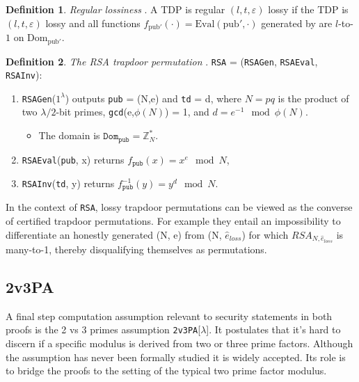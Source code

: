 \documentclass[]{final_report}
\theoremstyle{definition}
\newtheorem{definition}{Definition}[chapter]
\begin{document}
\begin{definition}
\label{def:reg-los}
\textit{Regular lossiness} \cite{10.1145/1374376.1374406, kakvi2018optimal}. A TDP is regular \( (l, t, \varepsilon) \) lossy if the TDP is \( (l, t, \varepsilon) \) lossy and all functions \( f_{\text{pub}'}(\cdot) = \text{Eval}(\text{pub}', \cdot) \) generated by  are \( l \)-to-\( 1 \) on \( \text{Dom}_{\text{pub}'} \).
\end{definition}

\begin{definition} 
\textit{The RSA trapdoor permutation} \cite{kakvi2018optimal}. \texttt{RSA} = (\texttt{RSAGen}, \texttt{RSAEval}, \texttt{RSAInv}): 
\begin{enumerate}
\item \texttt{RSAGen}($1^\lambda$) outputs \texttt{pub} = (N,e) and \texttt{td} = d, where $N = pq$ is the product of two $\lambda/2$-bit primes, \texttt{gcd}(e,$\phi(N)$) = 1, and $d = e^{-1} \mod \phi(N)$. 
\begin{itemize}
\item The domain is $\texttt{Dom}_{\texttt{pub}} = \mathbb{Z}_N^*$. 
\end{itemize}
\item \texttt{RSAEval}(\texttt{pub}, x) returns $f_{\texttt{pub}}(x) = x^e \mod N$, 
\item \texttt{RSAInv}(\texttt{td}, y) returns $f_{\texttt{pub}}^{-1}(y) = y^d \mod N$. 
\end{enumerate}

\end{definition} 

In the context of \texttt{RSA}, lossy trapdoor permutations can be viewed as the converse of certified trapdoor permutations. For example they entail an impossibility to differentiate an honestly generated (N, e) from (N, $\hat{e}_{loss}$) for which $RSA_{N, \hat{e}_{loss}}$ is many-to-1, thereby disqualifying themselves as permutations.


\subsection{2v3PA}
A final step computation assumption relevant to security statements in both proofs is the 2 vs 3 primes assumption \texttt{2v3PA}[$\lambda$]. It postulates that it's hard to discern if a specific modulus is derived from two or three prime factors. Although the assumption has never been formally studied it is widely accepted. Its role is to bridge the proofs to the setting of the typical two prime factor modulus.
\end{document}
